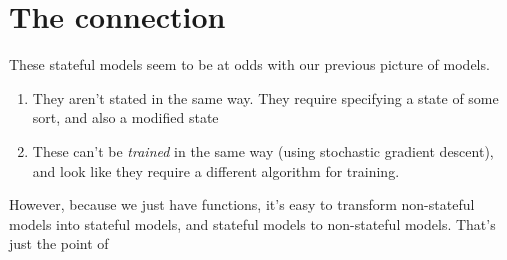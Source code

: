 \documentclass[]{article}
\begin{document}
\hypertarget{the-connection}{%
\section{The connection}\label{the-connection}}

These stateful models seem to be at odds with our previous picture of models.

\begin{enumerate}
\def\labelenumi{\arabic{enumi}.}
\tightlist
\item
  They aren't stated in the same way. They require specifying a state of some
  sort, and also a modified state
\item
  These can't be \emph{trained} in the same way (using stochastic gradient
  descent), and look like they require a different algorithm for training.
\end{enumerate}

However, because we just have functions, it's easy to transform non-stateful
models into stateful models, and stateful models to non-stateful models. That's
just the point of
\end{document}
